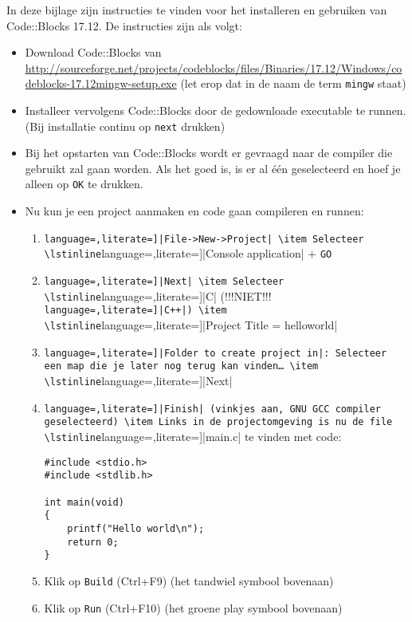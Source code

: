 \documentclass[a4paper,10pt,fleqn,twoside]{article}
\begin{document}
In deze bijlage zijn instructies te vinden voor het installeren en gebruiken van Code::Blocks 17.12. De instructies zijn als volgt:

\begin{itemize}
\item Download Code::Blocks van \url{http://sourceforge.net/projects/codeblocks/files/Binaries/17.12/Windows/codeblocks-17.12mingw-setup.exe} (let erop dat in de naam de term \texttt{mingw} staat)
\item Installeer vervolgens Code::Blocks door de gedownloade executable te runnen. (Bij installatie continu op \texttt{next} drukken)
\item Bij het opstarten van Code::Blocks wordt er gevraagd naar de compiler die gebruikt zal gaan worden. Als het goed is, is er al één geselecteerd en hoef je alleen op \texttt{OK} te drukken.
\item Nu kun je een project aanmaken en code gaan compileren en runnen:
\begin{enumerate}[label=\alph*.]
\item \lstinline[language=,literate=]|File->New->Project|
\item Selecteer \lstinline[language=,literate=]|Console application| + \lstinline|GO|
\item \lstinline[language=,literate=]|Next|
\item Selecteer \lstinline[language=,literate=]|C| (!!!NIET!!! \lstinline[language=,literate=]|C++|)
\item \lstinline[language=,literate=]|Project Title = helloworld|
\item \lstinline[language=,literate=]|Folder to create project in|: Selecteer een map die je later nog terug kan vinden…
\item \lstinline[language=,literate=]|Next|
\item \lstinline[language=,literate=]|Finish| (vinkjes aan, GNU GCC compiler geselecteerd)
\item Links in de projectomgeving is nu de file \lstinline[language=,literate=]|main.c| te vinden met code:

\begin{lstlisting}
#include <stdio.h>
#include <stdlib.h>

int main(void)
{
    printf("Hello world\n");
    return 0;
}
\end{lstlisting}
\item Klik op \lstinline|Build| (Ctrl+F9) (het tandwiel symbool bovenaan)
\item Klik op \lstinline|Run| (Ctrl+F10) (het groene play symbool bovenaan)
\end{enumerate}
\end{itemize}
\end{document}
